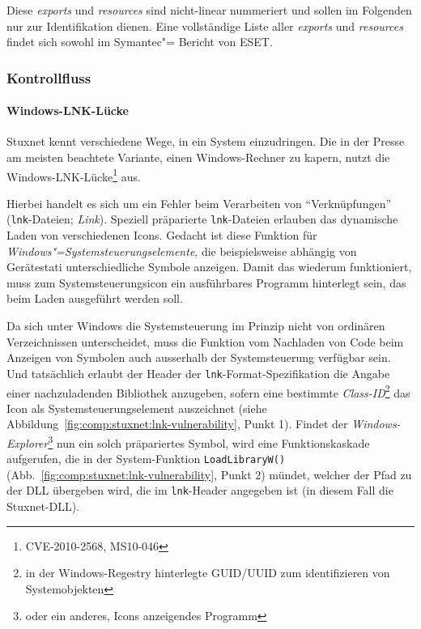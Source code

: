 Diese \textit{exports} und \textit{resources} sind nicht-linear
nummeriert und sollen im Folgenden nur zur Identifikation dienen. Eine
vollständige Liste aller \textit{exports} und \textit{resources}
findet sich sowohl im Symantec"=%
Bericht von ESET.

\subsubsection{Kontrollfluss}

\paragraph{Windows-LNK-Lücke}

Stuxnet kennt verschiedene Wege, in ein System einzudringen. Die in
der Presse am meisten beachtete Variante, einen Windows-Rechner zu
kapern, nutzt die Windows-LNK-Lücke\footnote{CVE-2010-2568, MS10-046}
aus.

Hierbei handelt es sich um ein Fehler beim Verarbeiten von
\enquote{Verknüpfungen} (\texttt{lnk}-Dateien;
\textit{Link}). Speziell präparierte \texttt{lnk}-Dateien erlauben das
dynamische Laden von verschiedenen Icons. Gedacht ist diese Funktion
für \textit{Windows"=Systemsteuerungselemente}, die beispielsweise
abhängig von Gerätestati unterschiedliche Symbole anzeigen.  Damit das
wiederum funktioniert, muss zum Systemsteuerungsicon ein ausführbares
Programm hinterlegt sein, das beim Laden ausgeführt werden soll.

Da sich unter Windows die Systemsteuerung im Prinzip nicht von
ordinären Verzeichnissen unterscheidet, muss die Funktion vom
Nachladen von Code beim Anzeigen von Symbolen auch ausserhalb der
Systemsteuerung verfügbar sein. Und tatsächlich erlaubt der Header der
\texttt{lnk}-Format-Spezifikation die Angabe einer nachzuladenden
Bibliothek anzugeben, sofern eine bestimmte
\textit{Class-ID}\footnote{in der Windows-Regestry hinterlegte
GUID/UUID zum identifizieren von Systemobjekten} das Icon als
Systemsteuerungselement auszeichnet (siehe
Abbildung~\ref{fig:comp:stuxnet:lnk-vulnerability}, Punkt 1).  Findet
der \textit{Windows-Explorer}\footnote{oder ein anderes, Icons
anzeigendes Programm} nun ein solch präpariertes Symbol, wird eine
Funktionskaskade aufgerufen, die in der System-Funktion
\texttt{LoadLibraryW()}
(Abb.~\ref{fig:comp:stuxnet:lnk-vulnerability}, Punkt 2) mündet,
welcher der Pfad zu der DLL übergeben wird, die im \texttt{lnk}-Header
angegeben ist (in diesem Fall die Stuxnet-DLL).

